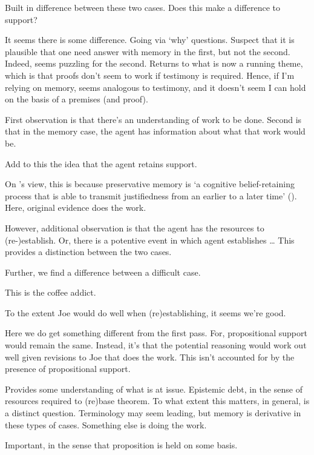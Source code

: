 \begin{note}
  Built in difference between these two cases.
  Does this make a difference to support?

  It seems there is some difference.
  Going via `why' questions.
  Suspect that it is plausible that one need answer with memory in the first, but not the second.
  Indeed, seems puzzling for the second.
  Returns to what is now a running theme, which is that proofs don't seem to work if testimony is required.
  Hence, if I'm relying on memory, seems analogous to testimony, and it doesn't seem I can hold on the basis of a premises (and proof).
  
\end{note}



\begin{note}[Coffee]
  First observation is that there's an understanding of work to be done.
  Second is that in the memory case, the agent has information about what that work would be.

  Add to this the idea that the agent retains support.

  On \citeauthor{Goldman:2011vn}'s view, this is because preservative memory is `a cognitive belief-retaining process that is able to transmit justiﬁedness from an earlier to a later time' (\citeyear[261]{Goldman:2011vn}).
  Here, original evidence does the work.

  However, additional observation is that the agent has the resources to (re-)establish.
  Or, there is a potentive event in which agent establishes \dots
  This provides a distinction between the two cases.

  Further, we find a difference between a difficult case.

  This is the coffee addict.

  To the extent Joe would do well when (re)establishing, it seems we're good.

  Here we do get something different from the first pass.
  For, propositional support would remain the same.
  Instead, it's that the potential reasoning would work out well given revisions to Joe that does the work.
  This isn't accounted for by the presence of propositional support.
\end{note}


\begin{note}[Sketch]
  Provides some understanding of what is at issue.
  Epistemic debt, in the sense of resources required to (re)base theorem.
  To what extent this matters, in general, is a distinct question.
  Terminology may seem leading, but memory is derivative in these types of cases.
  Something else is doing the work.

  Important, in the sense that proposition is held on some basis.
  

\end{note}



